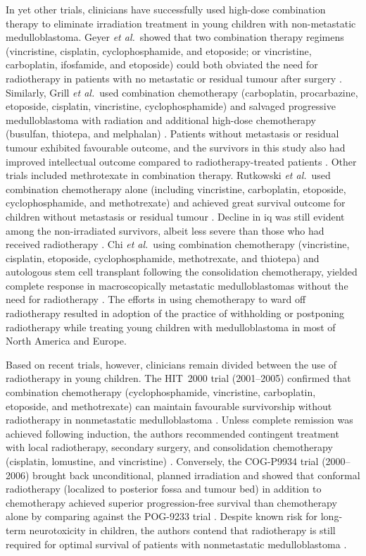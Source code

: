 In yet other trials, clinicians have successfully used high-dose combination therapy to eliminate irradiation treatment in young children with non-metastatic medulloblastoma. Geyer \emph{et al.}\ showed that two combination therapy regimens (vincristine, cisplatin, cyclophosphamide, and etoposide; or vincristine, carboplatin, ifosfamide, and etoposide) could both obviated the need for radiotherapy in patients with no metastatic or residual tumour after surgery .  Similarly, Grill \emph{et al.}\ used combination chemotherapy (carboplatin, procarbazine, etoposide, cisplatin, vincristine, cyclophosphamide) and salvaged progressive medulloblastoma with radiation and additional high-dose chemotherapy (busulfan, thiotepa, and melphalan) . Patients without metastasis or residual tumour exhibited favourable outcome, and the survivors in this study also had improved intellectual outcome compared to radiotherapy-treated patients . Other trials included methrotexate in combination therapy. Rutkowski \emph{et al.}\ used combination chemotherapy alone (including vincristine, carboplatin, etoposide, cyclophosphamide, and methotrexate) and achieved great survival outcome for children without metastasis or residual tumour . Decline in \gls{iq} was still evident among the non-irradiated survivors, albeit less severe than those who had received radiotherapy . Chi \emph{et al.}\ using combination chemotherapy (vincristine, cisplatin, etoposide, cyclophosphamide, methotrexate, and thiotepa) and autologous stem cell transplant following the consolidation chemotherapy, yielded complete response in macroscopically metastatic medulloblastomas without the need for radiotherapy . The efforts in using chemotherapy to ward off radiotherapy resulted in adoption of the practice of withholding or postponing radiotherapy while treating young children with medulloblastoma in most of North America and Europe.

Based on recent trials, however, clinicians remain divided between the use of radiotherapy in young children. The HIT~2000 trial (2001--2005) confirmed that combination chemotherapy (cyclophosphamide, vincristine, carboplatin, etoposide, and methotrexate) can maintain favourable survivorship without radiotherapy in nonmetastatic medulloblastoma . Unless complete remission was achieved following induction, the authors recommended contingent treatment with local radiotherapy, secondary surgery, and consolidation chemotherapy (cisplatin, lomustine, and vincristine) . Conversely, the COG-P9934 trial (2000--2006) brought back unconditional, planned irradiation and showed that conformal radiotherapy (localized to posterior fossa and tumour bed) in addition to chemotherapy achieved superior progression-free survival than chemotherapy alone by comparing against the POG-9233 trial . Despite known risk for long-term neurotoxicity in children, the authors contend that radiotherapy is still required for optimal survival of patients with nonmetastatic medulloblastoma .


